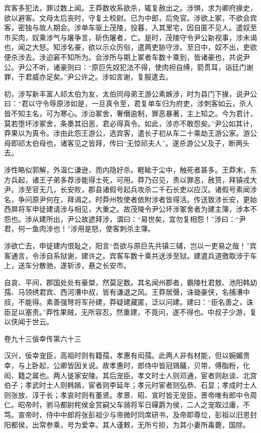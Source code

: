 \documentclass[12pt,UTF8]{ctexbook}
\begin{document}
宾客多犯法，罪过数上闻。王莽数收系欲杀，辄复赦出之。涉惧，求为卿府掾史，欲以避客。文母太后丧时，守复土校尉。已为中郎，后免官。涉欲上冢，不欲会宾客，密独与故人期会。涉单车驱上茂陵，投暮，入其里宅，因自匿不见人。遣奴至市买肉，奴乘涉气与屠争言，斫伤屠者，亡。是时，茂陵守令尹公新视事，涉未谒也，闻之大怒。知涉名豪，欲以示众厉俗，遣两吏胁守涉。至日中，奴不出，吏欲便杀涉去。涉迫窘不知所为。会涉所与期上冢者车数十乘到，皆诸豪也，共说尹公。尹公不听，诸豪则曰：“原巨先奴犯法不得，使肉袒自缚，箭贯耳，诣廷门谢罪，于君威亦足矣。”尹公许之。涉如言谢，复服遣去。



初，涉写新丰富人祁太伯为友，太伯同母弟王游公素嫉涉，时为县门下掾，说尹公曰：“君以守令辱原涉如是，一旦真令至，君复单车归为府吏，涉刺客如云，杀人皆不知主名，可为寒心。涉治冢舍，奢僭逾制，罪恶暴著，主上知之。今为君计，莫若堕坏涉冢舍，条奏其旧恶，君必得真令。如此，涉亦不敢怨矣。”尹公如其计，莽果以为真令。涉由此怨王游公，选宾客，遣长子初从车二十乘劫王游公家。游公母即祁太伯母也，诸客见之皆拜，传曰“无惊祁夫人”。遂杀游公父及子，断两头去。



涉性略似郭解，外温仁谦逊，而内隐好杀。睚眦于尘中，触死者甚多。王莽末，东方兵起，诸王子弟多荐涉能得士死，可用。莽乃召见，责以罪恶，赦贳，拜镇戎大尹。涉至官无几，长安败，郡县诸假号起兵攻杀二千石长吏以应汉。诸假号素闻涉名，争问原尹何在，拜谒之。时莽州牧使者依附涉者皆得活。传送致涉长安，更始西屏将军申徒建请涉与相见，大重之。故茂陵令尹公坏涉冢舍者为建主簿，涉本不怨也。涉从建所出，尹公故遮拜涉，谓曰：“易世矣，宜勿复相怨！”涉曰：“尹君，何一鱼肉涉也！”涉用是怒，使客刺杀主簿。



涉欲亡去，申徒建内恨耻之，阳言“吾欲与原巨先共镇三辅，岂以一吏易之哉！”宾客通言，令涉自系狱谢，建许之。宾客车数十乘共送涉至狱。建遣兵道徼取涉于车上，送车分散驰，遂斩涉，悬之长安市。



自哀、平间，郡国处处有豪桀，然莫足数。其名闻州郡者，霸陵杜君敖、池阳韩幼孺、马领绣君宾、西河漕中叔，皆有谦退之风。王莽居慑，诛锄豪侠，名捕漕中叔，不能得。素善强弩将军孙建，莽疑建藏匿，泛以问建。建曰：“臣名善之，诛臣足以塞责。”莽性果贼，无所容忍，然重建，不竟问，遂不得也。中叔子少游，复以侠闻于世云。





卷九十三佞幸传第六十三



汉兴，佞幸宠臣，高祖时则有籍孺，孝惠有闳孺。此两人非有材能，但以婉媚贵幸，与上卧起，公卿皆因关说。故孝惠时，郎侍中皆冠鵕鸃，贝带，傅脂粉，化闳、籍之属也。两人徙家安陵。其后宠臣，孝文时士人则邓通，宦者则赵谈、北宫伯子；孝武时士人则韩嫣，宦者则李延年；孝元时宦者则弘恭、石显；孝成时士人则张放、淳于长；孝哀时则有董贤。孝景、昭、宣时皆无宠臣。景帝唯有郎中令周仁。昭帝时，驸马都尉秺侯金赏嗣父车骑将军日磾爵为侯，二人之宠取过庸，不笃。宣帝时，侍中中郎将张彭祖少与帝微时同席研书，及帝即尊位，彭祖以旧恩封阳都侯，出常参乘，号为爱幸。其人谨敕，无所亏损，为其小妻所毒薨，国除。
\end{document}
